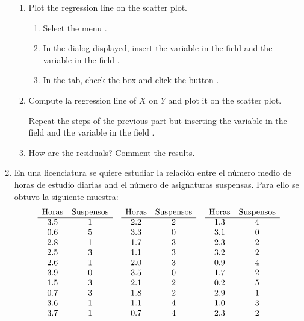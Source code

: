 \begin{enumerate}[leftmargin=*]
\begin{enumerate}
\item Plot the regression line on the scatter plot.
\begin{indication}
\begin{enumerate}
\item Select the menu .
\item In the dialog displayed, insert the variable  in the field  and the
variable  in the field .
\item In the  tab, check the box  and click the button
.
\end{enumerate}
\end{indication}

\item Compute la regression line of $X$ on $Y$ and plot it on the scatter plot.
\begin{indication}
Repeat the steps of the previous part but inserting the variable  in the field 
and the variable  in the field . 
\end{indication}

\item How are the residuals?
Comment the results.
\end{enumerate}


\item  En una licenciatura se quiere estudiar la relación entre el número medio de horas de estudio diarias and el número
de asignaturas suspensas. Para ello se obtuvo la siguiente muestra:
\[
\begin{array}{cccccccc}
\text{Horas} & \text{Suspensos} &  & \text{Horas} & \text{Suspensos} & & \text{Horas} & \text{Suspensos}  \\
\cline{1-2}\cline{4-5}\cline{7-8}
3.5 & 1 & & 2.2 & 2 & & 1.3 & 4 \\
0.6 & 5 & & 3.3 & 0 & & 3.1 & 0 \\
2.8 & 1 & & 1.7 & 3 & & 2.3 & 2 \\
2.5 & 3 & & 1.1 & 3 & & 3.2 & 2 \\
2.6 & 1 & & 2.0 & 3 & & 0.9 & 4 \\
3.9 & 0 & & 3.5 & 0 & & 1.7 & 2 \\
1.5 & 3 & & 2.1 & 2 & & 0.2 & 5 \\
0.7 & 3 & & 1.8 & 2 & & 2.9 & 1 \\
3.6 & 1 & & 1.1 & 4 & & 1.0 & 3 \\
3.7 & 1 & & 0.7 & 4 & & 2.3 & 2 \\
\end{array}
\]


\end{enumerate}
